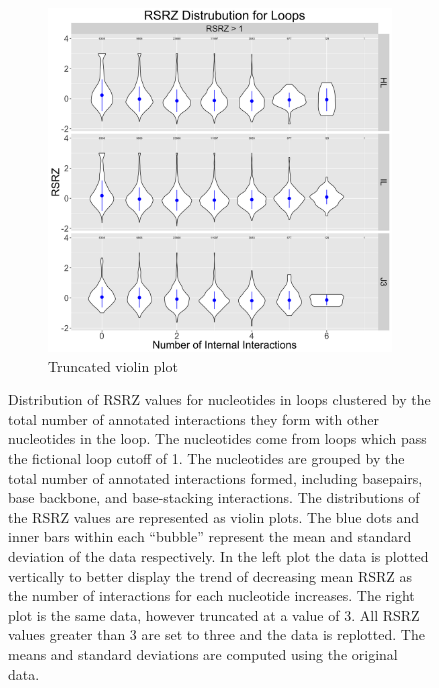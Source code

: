 \begin{figure}
\begin{subfigure}[b]{0.45\textwidth}
    \includegraphics[width=\textwidth]{chapter-5/figs/loops/b}
    \caption{Truncated violin plot}
    \label{fig:truncated-rsrz-dist}
  \end{subfigure}

  \caption{Distribution of RSRZ values for nucleotides in loops clustered by
    the total number of annotated interactions they form with other nucleotides
    in the loop. The nucleotides come from loops which pass the fictional loop
    cutoff of 1. The nucleotides are grouped by the total number of annotated interactions
    formed, including basepairs, base backbone, and base-stacking interactions.
    The distributions of the RSRZ values are represented as violin plots. The
    blue dots and inner bars within each ``bubble'' represent the mean and
    standard deviation of the data respectively. In the left plot the data is
    plotted vertically to better display the trend of decreasing mean RSRZ as
    the number of interactions for each nucleotide increases. The right plot is
    the same data, however truncated at a value of 3. All RSRZ values greater than 3
    are set to three and the data is replotted. The means and standard deviations
  are computed using the original data.}
\end{figure}

